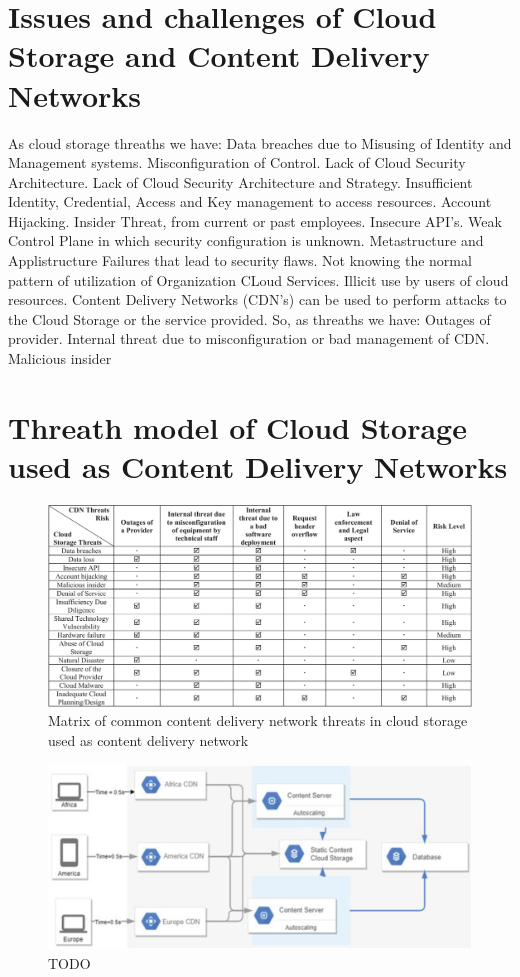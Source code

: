 \documentclass[14pt,oneside]{extreport}
\newcommand*\fpar{\hspace{1ex}}
\begin{document}
\section{Issues and challenges of Cloud Storage and Content Delivery Networks}
\fpar As cloud storage threaths we have: Data breaches due to Misusing of Identity and Management systems. Misconfiguration of Control. Lack of Cloud Security Architecture. Lack of Cloud Security Architecture and Strategy. Insufficient Identity, Credential, Access and Key management to access resources. Account Hijacking. Insider Threat, from current or past employees. Insecure API's. Weak Control Plane in which security configuration is unknown. Metastructure and Applistructure Failures that lead to security flaws. Not knowing the normal pattern of utilization of Organization CLoud Services. Illicit use by users of cloud resources.
\fpar Content Delivery Networks (CDN's) can be used to perform attacks to the Cloud Storage or the service provided. So, as threaths we have: Outages of provider. Internal threat due to misconfiguration or bad management of CDN. Malicious insider

\section{Threath model of Cloud Storage used as Content Delivery Networks}

\fpar
\begin{figure}[H]
    \centering
    \includegraphics[width=\textwidth]{paper3/3_table.png}
    \caption{Matrix of common content delivery network threats in cloud storage used as content delivery network}
    \label{fig:table}
\end{figure}
\begin{figure}[H]
  \centering
  \includegraphics[width=\textwidth]{paper3/threats.png}
  \caption{TODO}
  \label{fig:TODO}
\end{figure}
\end{document}
